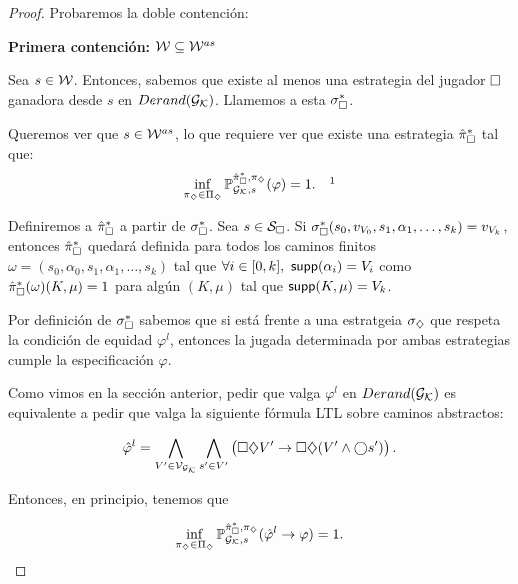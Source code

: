 \begin{proof}
	Probaremos la doble contención:

	\textbf{Primera contención: } $\mathcal{W} \subseteq \mathcal{W}^{as}$

	Sea $s \in \mathcal{W}$. Entonces, sabemos que existe al menos una estrategia del
	jugador $\square$ ganadora desde $s$ en $Derand(\mathcal{G}_{\mathcal{K}})$. Llamemos a esta
	$\sigma_\square^{*}$.

	Queremos ver que $s \in \mathcal{W}^{as}$, lo que requiere ver que existe una estrategia
	$\hat{\pi}_{\square}^{*}$ tal que:
	\begin{equation}
		\label{pisirve}
		\inf_{\pidiam \in \Pidiam} \Prob_{\Gk,s}^{\picuadGk, \pidiam}(\varphi) = 1. \quad \footnotemark
	\end{equation}

	Definiremos a $\hat{\pi}_{\square}^{*}$ a partir de $\sigma_\square^*$. Sea $s \in \mathcal{S}_\square$.
	Si $\sigma_\square^*(s_0, v_{V_0}, s_1, \alpha_1, \dots, s_k) = v_{V_k}$,
	entonces $\hat{\pi}_{\square}^{*}$ quedará definida para todos los caminos finitos $\omega =
		(s_0, \alpha_0, s_1, \alpha_1, \dots, s_k)$ tal que $\forall i \in [0, k], \
		\textsf{supp}(\alpha_i) = V_i$ como $\hat{\pi}_{\square}^{*} (\omega)(K, \mu) = 1$ para algún $(K,
		\mu)$ tal que $\textsf{supp}(K, \mu) = V_k$.


	Por definición de $\sigma_\square^*$ sabemos que si está frente a una estratgeia
	$\sigma_\diamondsuit$ que respeta la condición de equidad $\varphi^l$, entonces la
	jugada determinada por ambas estrategias cumple la especificación $\varphi$.

	Como vimos en la sección anterior, pedir que valga $\varphi^l$ en $Derand(\mathcal{G}_{\mathcal{K}})$ es
	equivalente a pedir que valga la siguiente fórmula LTL sobre caminos
	abstractos:

	$$\hat \varphi^l = \bigwedge_{V' \in \mathcal{V}_{\mathcal{G}_{\mathcal{K}}}} \bigwedge_{s' \in V'} \left( \square \diamondsuit V' \rightarrow \square \diamondsuit (V' \wedge \bigcirc s') \right).$$

	Entonces, en principio, tenemos que

	$$\inf_{\pi_\diamondsuit \in \Pi_\diamondsuit} \mathbb{P}^{\hat{\pi}_{\square}^{*}, \pi_\diamondsuit}_{\mathcal{G}_{\mathcal{K}}, s} (\hat \varphi^l \rightarrow \varphi) = 1.$$


\end{proof}
